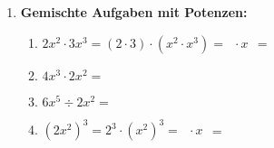 \begin{enumerate}[label=\arabic*., resume]
    \vspace{1cm}

    \item \textbf{Gemischte Aufgaben mit Potenzen:}

    \vspace{0.5cm}

    \begin{enumerate}[label=\alph*)]
        \item $2x^2 \cdot 3x^3 = (2 \cdot 3) \cdot (x^2 \cdot x^3) = \phantom{0} \cdot x^{\phantom{0}}$ = \underline{\hspace{3cm}}
        \vspace{0.5cm}
        \item $4x^3 \cdot 2x^2 = $ \underline{\hspace{4cm}}
        \vspace{0.5cm}
        \item $6x^5 \div 2x^2 = $ \underline{\hspace{4cm}}
        \vspace{0.5cm}
        \item $(2x^2)^3 = 2^3 \cdot (x^2)^3 = \phantom{0} \cdot x^{\phantom{0}}$ = \underline{\hspace{3cm}}
    \end{enumerate}

\end{enumerate}
